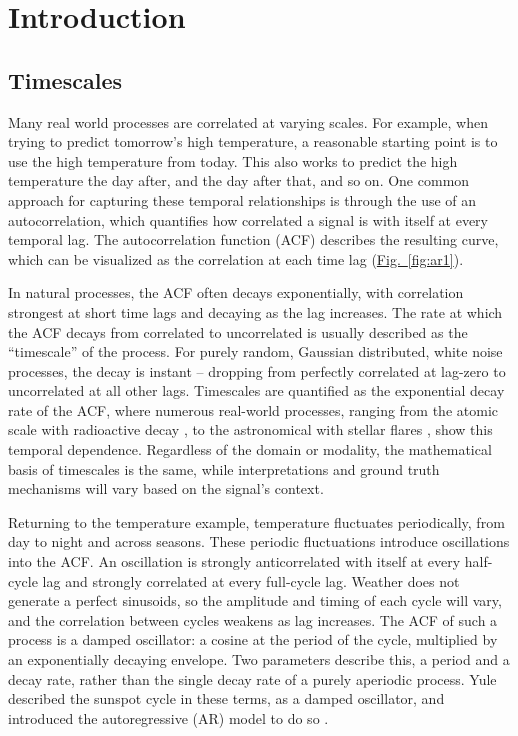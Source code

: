 \documentclass[pdflatex,sn-mathphys-num]{sn-jnl}
\newcommand{\figpanel}[2]{\hyperref[#1]{Fig.~\ref*{#1}#2}}
\begin{document}
\maketitle

\section{Introduction}\label{sec:intro}

\subsection{Timescales}\label{sec:timescales}

Many real world processes are correlated at varying scales. For example, when trying to predict tomorrow's high temperature, a reasonable starting point is to use the high temperature from today. This also works to predict the high temperature the day after, and the day after that, and so on. One common approach for capturing these temporal relationships is through the use of an autocorrelation, which quantifies how correlated a signal is with itself at every temporal lag. The autocorrelation function (ACF) describes the resulting curve, which can be visualized as the correlation at each time lag (\figpanel{fig:ar1}{}).

In natural processes, the ACF often decays exponentially, with correlation strongest at short time lags and decaying as the lag increases. The rate at which the ACF decays from correlated to uncorrelated is usually described as the ``timescale'' of the process. For purely random, Gaussian distributed, white noise processes, the decay is instant -- dropping from perfectly correlated at lag-zero to uncorrelated at all other lags. Timescales are quantified as the exponential decay rate of the ACF, where numerous real-world processes, ranging from the atomic scale with radioactive decay \cite{semkow_oscillations_2009}, to the astronomical with stellar flares \cite{anfinogentov_decaying_2013}, show this temporal dependence. Regardless of the domain or modality, the mathematical basis of timescales is the same, while interpretations and ground truth mechanisms will vary based on the signal's context.

Returning to the temperature example, temperature fluctuates periodically, from day to night and across seasons. These periodic fluctuations introduce oscillations into the ACF. An oscillation is strongly anticorrelated with itself at every half-cycle lag and strongly correlated at every full-cycle lag. Weather does not generate a perfect sinusoids, so the amplitude and timing of each cycle will vary, and the correlation between cycles weakens as lag increases. The ACF of such a process is a damped oscillator: a cosine at the period of the cycle, multiplied by an exponentially decaying envelope. Two parameters describe this, a period and a decay rate, rather than the single decay rate of a purely aperiodic process. Yule described the sunspot cycle in these terms, as a damped oscillator, and introduced the autoregressive (AR) model to do so \cite{yule_1927}.
\end{document}
